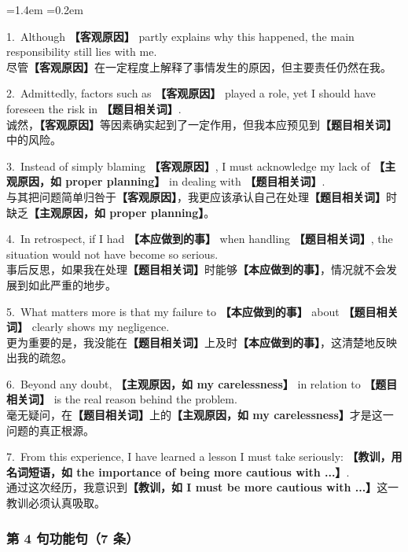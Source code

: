 \documentclass[11pt,a4paper]{ctexart}
\newcommand{\fillin}[1]{{\bfseries【#1】}}
\newenvironment{eg}{%
  \par\addvspace{4pt}%
  \begin{list}{}{\leftmargin=1.4em \rightmargin=0.2em \listparindent=0pt
    \itemindent=0pt \topsep=0pt \parsep=2pt \itemsep=2pt \partopsep=0pt}%
  \item\relax
}{%
  \end{list}\addvspace{5pt}%
}
\begin{document}
\begin{eg}
1.\ Although \fillin{客观原因} partly explains why this happened, the main responsibility still lies with me.\\
尽管\fillin{客观原因}在一定程度上解释了事情发生的原因，但主要责任仍然在我。

2.\ Admittedly, factors such as \fillin{客观原因} played a role, yet I should have foreseen the risk in \fillin{题目相关词}.\\
诚然，\fillin{客观原因}等因素确实起到了一定作用，但我本应预见到\fillin{题目相关词}中的风险。

3.\ Instead of simply blaming \fillin{客观原因}, I must acknowledge my lack of \fillin{主观原因，如 proper planning} in dealing with \fillin{题目相关词}.\\
与其把问题简单归咎于\fillin{客观原因}，我更应该承认自己在处理\fillin{题目相关词}时缺乏\fillin{主观原因，如 proper planning}。

4.\ In retrospect, if I had \fillin{本应做到的事} when handling \fillin{题目相关词}, the situation would not have become so serious.\\
事后反思，如果我在处理\fillin{题目相关词}时能够\fillin{本应做到的事}，情况就不会发展到如此严重的地步。

5.\ What matters more is that my failure to \fillin{本应做到的事} about \fillin{题目相关词} clearly shows my negligence.\\
更为重要的是，我没能在\fillin{题目相关词}上及时\fillin{本应做到的事}，这清楚地反映出我的疏忽。

6.\ Beyond any doubt, \fillin{主观原因，如 my carelessness} in relation to \fillin{题目相关词} is the real reason behind the problem.\\
毫无疑问，在\fillin{题目相关词}上的\fillin{主观原因，如 my carelessness}才是这一问题的真正根源。

7.\ From this experience, I have learned a lesson I must take seriously: \fillin{教训，用名词短语，如 the importance of being more cautious with ...}.\\
通过这次经历，我意识到\fillin{教训，如 I must be more cautious with ...}这一教训必须认真吸取。
\end{eg}

\subsubsection{第 4 句功能句（7 条）}
\end{document}
